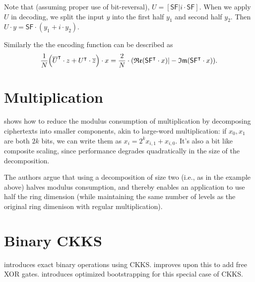 \documentclass[../fheimpl.tex]{subfiles}
\begin{document}
    Note that (assuming proper use of bit-reversal), $U=[\mathsf{SF} | i\cdot \mathsf{SF}]$. When we apply $U$ in decoding, we split the input $y$ into the first half $y_1$ and second half $y_2$. Then $U\cdot y = \mathsf{SF}\cdot (y_1+i\cdot y_2)$.

    Similarly the the encoding function can be described as
    \[\frac{1}{N}\parens*{\overline{U}^\intercal\cdot z+U^\intercal \cdot \overline{z}}\cdot x = \frac{2}{N}\cdot (\mathfrak{Re}(\mathsf{SF}^\intercal\cdot x) | -\mathfrak{Im}(\mathsf{SF}^\intercal\cdot x)).\]

\section{Multiplication}
    \cite{cryptoeprint:2023/1788} shows how to reduce the modulus consumption of multiplication by decomposing ciphertexts into smaller components, akin to large-word multiplication: if $x_0,x_1$ are both $2k$ bits, we can write them as $x_i = 2^kx_{i,1} + x_{i,0}$. It's also a bit like composite scaling, since performance degrades quadratically in the size of the decomposition.
    
    The authors argue that using a decomposition of size two (i.e., as in the example above) halves modulus consumption, and thereby enables an application to use half the ring dimension (while maintaining the same number of levels as the original ring dimenison with regular multiplication).

\section{Binary CKKS}
    \cite{cryptoeprint:2022/1298} introduces exact binary operations using CKKS. \cite{cryptoeprint:2025/074} improves upon this to add free XOR gates. \cite{cryptoeprint:2024/767} introduces optimized bootstrapping for this special case of CKKS.
    

\ifcompileasbook
\else
    \printbibliography
\fi
	
\end{document}
